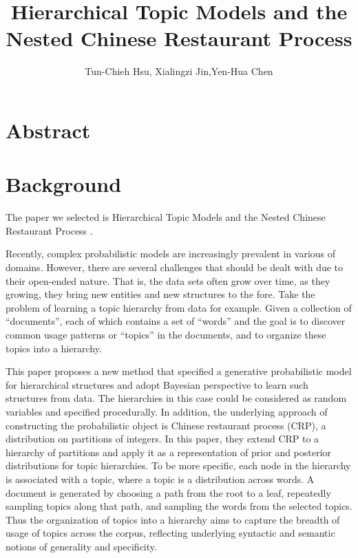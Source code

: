 \documentclass[a4paper]{article}
\title{\bf Hierarchical Topic Models and the Nested Chinese Restaurant Process}
\author{Tun-Chieh Hsu, Xialingzi Jin,Yen-Hua Chen}
\begin{document}
\maketitle



\section{Abstract}


\section{Background}

The paper we selected is Hierarchical Topic Models and the Nested Chinese Restaurant Process \cite{Blei_Griffiths_Jordan_Tenenbaum_2004}. 

Recently, complex probabilistic models are increasingly prevalent in various of  domains. However, there are several challenges that should be dealt with due to their open-ended nature. That is, the data sets often grow over time, as they growing, they bring new entities and new structures to the fore. Take the problem of learning a topic hierarchy from data for example. Given a collection of ``documents'', each of which contains a set of ``words'' and the goal is to discover common usage patterns or ``topics'' in the documents, and to organize these topics into a hierarchy. 


This paper proposes a new method that specified a generative probabilistic model
for hierarchical structures and adopt Bayesian perspective to learn such structures from data. 
The hierarchies in this case could be considered as random variables and specified procedurally.
In addition, the underlying approach of constructing the probabilistic object is Chinese restaurant process (CRP), a distribution on partitions of integers. In this paper, they extend CRP to a hierarchy of partitions and apply it as a representation of prior and posterior distributions for topic hierarchies. To be more specific, each node in the hierarchy is associated with a topic, where a topic is a distribution across words. A document is generated by choosing a path from the root to a leaf, repeatedly sampling topics along that path, and sampling the words from the selected topics. Thus the organization of topics into a hierarchy aims to capture the breadth of usage of topics across the corpus, reflecting underlying syntactic and semantic notions of generality and specificity. 
\end{document}
